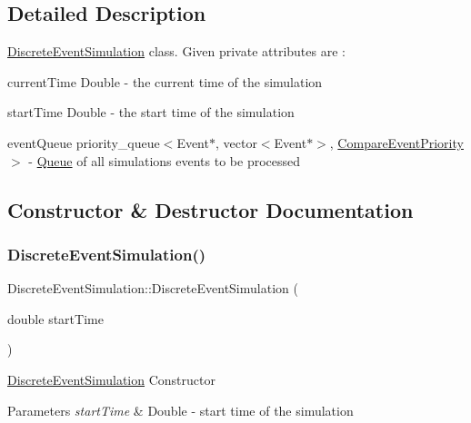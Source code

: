 \subsection{Detailed Description}
\hyperlink{classDiscreteEventSimulation}{Discrete\+Event\+Simulation} class. Given private attributes are \+:
\begin{DoxyItemize}
\item current\+Time Double -\/ the current time of the simulation
\item start\+Time Double -\/ the start time of the simulation
\item event\+Queue priority\+\_\+queue$<$Event$\ast$, vector$<$\+Event$\ast$$>$, \hyperlink{classCompareEventPriority}{Compare\+Event\+Priority}$>$ -\/ \hyperlink{classQueue}{Queue} of all simulation\textquotesingle{}s events to be processed 
\end{DoxyItemize}

\subsection{Constructor \& Destructor Documentation}
\mbox{\label{classDiscreteEventSimulation_afef7ef964c3a7d151150120184c58d99}} 
\subsubsection{\texorpdfstring{Discrete\+Event\+Simulation()}{DiscreteEventSimulation()}\hspace{0.1cm}{\footnotesize\ttfamily [1/2]}}
{\footnotesize\ttfamily Discrete\+Event\+Simulation\+::\+Discrete\+Event\+Simulation (\begin{DoxyParamCaption}\item[{double}]{start\+Time }\end{DoxyParamCaption})\hspace{0.3cm}{\ttfamily [explicit]}}

\hyperlink{classDiscreteEventSimulation}{Discrete\+Event\+Simulation} Constructor 
\begin{DoxyParams}{Parameters}
{\em start\+Time} & Double -\/ start time of the simulation \\
\hline
\end{DoxyParams}
\mbox{\label{classDiscreteEventSimulation_aa92e10279fe95449f35139a4893192f5}} 
